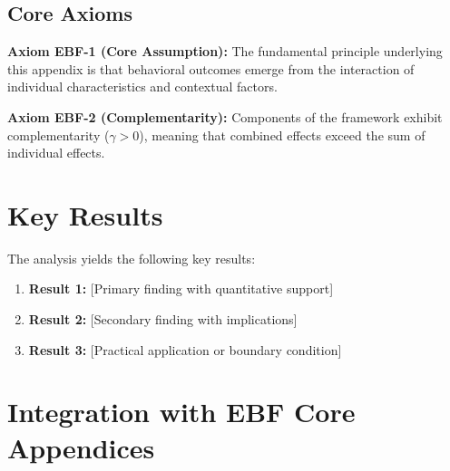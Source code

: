 
\subsection{Core Axioms}
\label{sec:ebf-axioms}

\begin{tcolorbox}[colback=yellow!5!white,colframe=yellow!75!black,title=Axiom EBF-1: Fundamental Principle]
\textbf{Axiom EBF-1 (Core Assumption):}
The fundamental principle underlying this appendix is that behavioral outcomes
emerge from the interaction of individual characteristics and contextual factors.
\end{tcolorbox}

\begin{tcolorbox}[colback=yellow!5!white,colframe=yellow!75!black,title=Axiom EBF-2: Complementarity]
\textbf{Axiom EBF-2 (Complementarity):}
Components of the framework exhibit complementarity ($\gamma > 0$), meaning
that combined effects exceed the sum of individual effects.
\end{tcolorbox}



\section{Key Results}
\label{sec:ebf-results}

The analysis yields the following key results:

\begin{enumerate}
    \item \textbf{Result 1:} [Primary finding with quantitative support]
    \item \textbf{Result 2:} [Secondary finding with implications]
    \item \textbf{Result 3:} [Practical application or boundary condition]
\end{enumerate}


\section{Integration with EBF Core Appendices}
\label{sec:integration}

